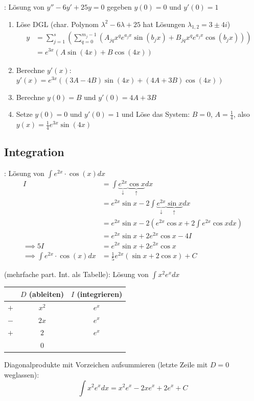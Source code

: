 \Bsp {}: Lösung von $y'' - 6y' + 25y = 0$ gegeben $y(0) = 0$ und $y'(0) = 1$
\begin{enumerate}
    \item Löse DGL (char. Polynom $\lambda^2 - 6\lambda + 25$ hat Lösungen $\lambda_{1, 2} = 3 \pm 4i$)
    \begin{align*}
        y &= \sum_{j=1}^{s} \left(\sum_{q=0}^{m_j-1}(A_{jq} x^q e^{a_j x} \sin(b_j x) + B_{jq} x^q e^{a_j x} \cos(b_j x))\right) \\
          &= e^{3x} (A \sin(4 x) + B  \cos(4 x))
    \end{align*}
    \item Berechne $y'(x)$: $y'(x) = e^{3x} ((3A - 4B) \sin(4x) + (4A + 3B) \cos(4x))$
    \item Berechne $y(0) = B$ und $y'(0) = 4A + 3B$
    \item Setze $y(0) = 0$ und $y'(0) = 1$ und Löse das System: $B = 0$, $A = \frac{1}{4}$,
     also  $y(x) = \frac{1}{4}e^{3x} \sin(4 x)$
\end{enumerate}

\subsection{Integration}

\Bsp {}: Lösung von $\displaystyle \int e^{2x} \cdot \cos(x) dx$
\vspace{-0.6em}
\begin{align*}
     I &= \int \underbrace{e^{2x}}_\downarrow \underbrace{\cos x}_\uparrow dx \\[-0.8em]
       &= e^{2x} \sin x - 2 \int \underbrace{e^{2x}}_\downarrow \underbrace{\sin x}_\uparrow dx \\[-0.8em]
       &= e^{2x} \sin x - 2 (e^{2x} \cos x + 2 \int e^{2x} \cos x dx) \\[-0.6em]
       &= e^{2x} \sin x + 2 e^{2x} \cos x - 4 I \\[-0.2em]
    \implies 5I &= e^{2x} \sin x + 2 e^{2x} \cos x \\[-0.4em]
    \implies \int e^{2x} \cdot \cos(x) dx &= \frac{1}{5}e^{2x}(\sin x + 2\cos x) + C
\end{align*}


\begin{minipage}{\linewidth}
\Bsp {} (mehrfache part. Int. als Tabelle): Lösung von $\displaystyle \int x^2 e^x dx$
\vspace{-0.6em}
\begin{center}
\begin{tabular}{c|c c}
     & $D$ (ableiten) & $I$ (integrieren) \\
    \hline
    $+$ & $x^2$ & $e^x$ \\
    $-$ & $2x$ & $e^x$ \\
    $+$ & $2$ & $e^x$ \\
     & $0$ &
\end{tabular}
\end{center}
\vspace{-0.4em}
Diagonalprodukte mit Vorzeichen aufsummieren (letzte Zeile mit $D = 0$ weglassen):
$$\int x^2 e^x dx = x^2e^x - 2xe^x + 2e^x + C$$
\end{minipage}

